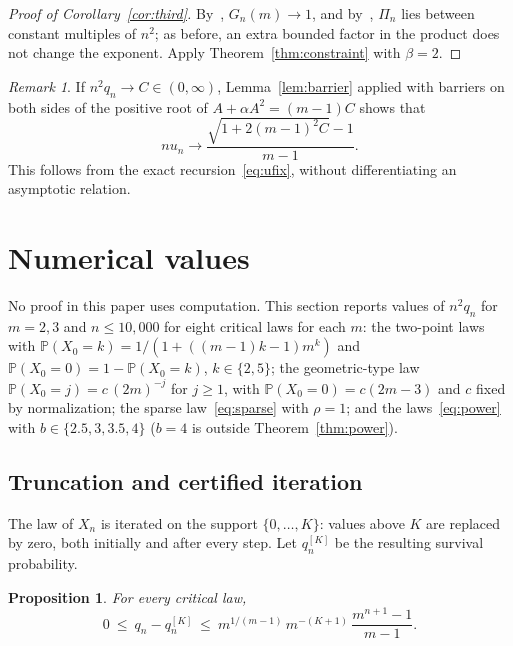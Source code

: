 \documentclass[11pt]{amsart}
\newtheorem{proposition}[theorem]{Proposition}
\theoremstyle{remark}
\newtheorem{remark}[theorem]{Remark}
\numberwithin{equation}{section}
\newcommand{\PP}{\mathbb{P}}
\begin{document}
\begin{proof}[Proof of Corollary~\ref{cor:third}]
By~\cite[Theorem~2]{CDHLS}, $G_n(m)\to1$, and by~\cite[Propositions~1 and~2]{CDHLS}, $\Pi_n$ lies between constant multiples of $n^2$; as before, an extra bounded factor in the product does not change the exponent. Apply Theorem~\ref{thm:constraint} with $\beta=2$.
\end{proof}

\begin{remark}
If $n^2q_n\to C\in(0,\infty)$, Lemma~\ref{lem:barrier} applied with barriers on both sides of the positive root of $A+\alpha A^2=(m-1)C$ shows that
\[
nu_n\to\frac{\sqrt{1+2(m-1)^2C}-1}{m-1}.
\]
This follows from the exact recursion~\eqref{eq:ufix}, without differentiating an asymptotic relation.
\end{remark}

\section{Numerical values}\label{sec:numerics}
No proof in this paper uses computation. This section reports values of $n^2q_n$ for $m=2,3$ and $n\le10{,}000$ for eight critical laws for each $m$: the two-point laws with $\PP(X_0=k)=1/(1+((m-1)k-1)m^k)$ and $\PP(X_0=0)=1-\PP(X_0=k)$, $k\in\{2,5\}$; the geometric-type law $\PP(X_0=j)=c\,(2m)^{-j}$ for $j\ge1$, with $\PP(X_0=0)=c(2m-3)$ and $c$ fixed by normalization; the sparse law~\eqref{eq:sparse} with $\rho=1$; and the laws~\eqref{eq:power} with $b\in\{2.5,3,3.5,4\}$ ($b=4$ is outside Theorem~\ref{thm:power}).

\subsection{Truncation and certified iteration}
The law of $X_n$ is iterated on the support $\{0,\dots,K\}$: values above $K$ are replaced by zero, both initially and after every step. Let $q_n^{[K]}$ be the resulting survival probability.

\begin{proposition}\label{prop:trunc}
For every critical law,
\begin{equation}\label{eq:trunc}
0\ \le\ q_n-q_n^{[K]}\ \le\ m^{1/(m-1)}\,m^{-(K+1)}\,\frac{m^{n+1}-1}{m-1}.
\end{equation}
\end{proposition}
\end{document}
